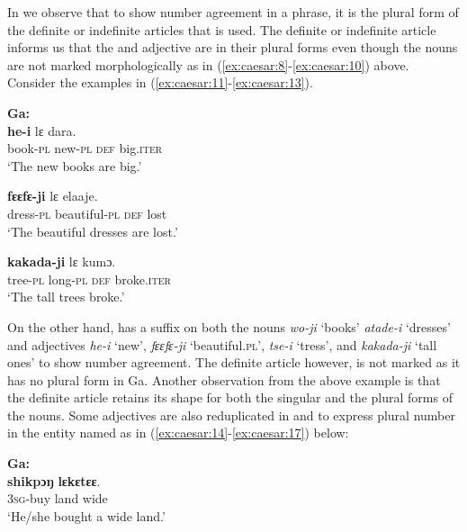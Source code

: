 \documentclass[output=paper,
modfonts
]{langscibook}
\begin{document}
In  we observe that to show number agreement in a  phrase, it is the plural form of the definite or indefinite articles that is used. The definite or indefinite article informs us that the  and adjective are in their plural forms even though the nouns are not marked morphologically as in (\ref{ex:caesar:8}-\ref{ex:caesar:10}) above. Consider the  examples in (\ref{ex:caesar:11}-\ref{ex:caesar:13}).
\newpage 






\ea\label{ex:caesar:11}
\textbf{Ga:}\\
 \textbf{{he-i}} {lɛ} {dara.}\\
 book-\textsc{pl} new-\textsc{pl} \textsc{def} big.\textsc{iter}\\
\glt  ‘The new books are big.’
\z



\ea\label{ex:caesar:12}
 \textbf{{fɛɛfɛ-ji}} {lɛ} {elaaje.}\\
 dress-\textsc{pl} beautiful-\textsc{pl} \textsc{def} lost\\
\glt  ‘The beautiful dresses are lost.’
\z

\ea\label{ex:caesar:13}
 \textbf{{kakada-ji}} {lɛ} {kumɔ.}\\
tree-\textsc{pl} long-\textsc{pl} \textsc{def} broke.\textsc{iter} \\
\glt ‘The tall trees broke.’
\z




On the other hand,  has a suffix on both the nouns \textit{wo-ji} ‘books’ \textit{atade-i} ‘dresses’ and adjectives \textit{he-i} ‘new’, \textit{fɛɛfɛ-ji} ‘beautiful.\textsc{pl}’, \textit{tse-i} ‘tress’, and \textit{kakada-ji} ‘tall ones’ to show number agreement. The definite article however, is not marked as it has no plural form in Ga. Another observation from the above  example is that the definite article retains its shape for both the singular and the plural forms of the nouns. Some adjectives are also reduplicated in  and  to express plural number in the entity named as in (\ref{ex:caesar:14}-\ref{ex:caesar:17}) below:

\ea\label{ex:caesar:14}
\textbf{Ga:}\\
 \textbf{{shikpɔŋ}} \textbf{{lɛkɛtɛɛ}}.\\
 3\textsc{sg}-buy land wide\\
\glt ‘He/she bought a wide land.’
\z
\end{document}
